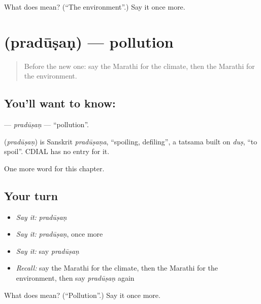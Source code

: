 \begin{tcolorbox}[breakable,colback=teal!4,colframe=teal!35!black,title={Before you move on}]
What does  mean? (\textquotedblleft{}The environment\textquotedblright{}.) Say it once more.
\end{tcolorbox}
\section[\texorpdfstring{\mr{प्रदूषण} (pradūṣaṇ)}{प्रदूषण (pradūṣaṇ)}]{ (pradūṣaṇ) — pollution}

\label{lesson:MR-C184-pradusan}



\begin{quote}
Before the new one: say the Marathi for the climate, then the Marathi for the environment.
\end{quote}

\subsection*{You'll want to know: }
\textbf{} — \emph{pradūṣaṇ} — \textquotedblleft{}pollution\textquotedblright{}.

\begin{cousinweb}
\textbf{} (\emph{pradūṣaṇ}) is Sanskrit \emph{pradūṣaṇa}, \textquotedblleft{}spoiling, defiling\textquotedblright{}, a tatsama built on \emph{duṣ}, \textquotedblleft{}to spoil\textquotedblright{}. CDIAL has no entry for it.
\end{cousinweb}

\begin{grammarlens}[title={What you've built}]
One more word for this chapter.
\end{grammarlens}

\subsection*{Your turn}
\begin{itemize}
\raggedright
  \item \emph{Say it:} \emph{pradūṣaṇ}
  \item \emph{Say it:} \emph{pradūṣaṇ}, once more
  \item \emph{Say it:} say \emph{pradūṣaṇ}
  \item \emph{Recall:} say the Marathi for the climate, then the Marathi for the environment, then say \emph{pradūṣaṇ} again
\end{itemize}

\begin{tcolorbox}[breakable,colback=teal!4,colframe=teal!35!black,title={Before you move on}]
What does  mean? (\textquotedblleft{}Pollution\textquotedblright{}.) Say it once more.
\end{tcolorbox}

